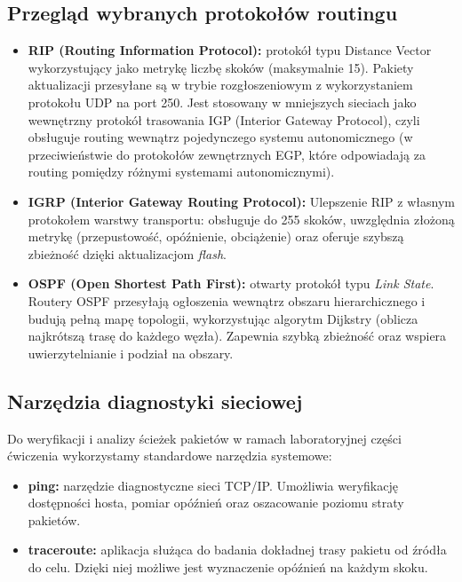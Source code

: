 \documentclass[12pt, a4paper]{article}
\begin{document}
\subsection{Przegląd wybranych protokołów routingu}
\begin{itemize}
    \item \textbf{RIP (Routing Information Protocol):} protokół typu Distance Vector wykorzystujący jako metrykę liczbę skoków (maksymalnie 15). Pakiety aktualizacji przesyłane są w trybie rozgłoszeniowym z wykorzystaniem protokołu UDP na port 250. Jest stosowany w mniejszych sieciach jako wewnętrzny protokół trasowania IGP (Interior Gateway Protocol), czyli obsługuje routing wewnątrz pojedynczego systemu autonomicznego (w przeciwieństwie do protokołów zewnętrznych EGP, które odpowiadają za routing pomiędzy różnymi systemami autonomicznymi).
    \item \textbf{IGRP (Interior Gateway Routing Protocol):} Ulepszenie RIP z własnym protokołem warstwy transportu: obsługuje do 255 skoków, uwzględnia złożoną metrykę (przepustowość, opóźnienie, obciążenie) oraz oferuje szybszą zbieżność dzięki aktualizacjom \textit{flash}.
    \item \textbf{OSPF (Open Shortest Path First):} otwarty protokół typu \textit{Link State}. Routery OSPF przesyłają ogłoszenia wewnątrz obszaru hierarchicznego i budują pełną mapę topologii, wykorzystując algorytm Dijkstry (oblicza najkrótszą trasę do każdego węzła). Zapewnia szybką zbieżność oraz wspiera uwierzytelnianie i podział na obszary.
\end{itemize}

\subsection{Narzędzia diagnostyki sieciowej}
Do weryfikacji i analizy ścieżek pakietów w ramach laboratoryjnej części ćwiczenia wykorzystamy standardowe narzędzia systemowe:
\begin{itemize}
    \item \textbf{ping:} narzędzie diagnostyczne sieci TCP/IP. Umożliwia weryfikację dostępności hosta, pomiar opóźnień oraz oszacowanie poziomu straty pakietów.
    \item \textbf{traceroute:} aplikacja służąca do badania dokładnej trasy pakietu od źródła do celu. Dzięki niej możliwe jest wyznaczenie  opóźnień na każdym skoku.
\end{itemize}
\end{document}
